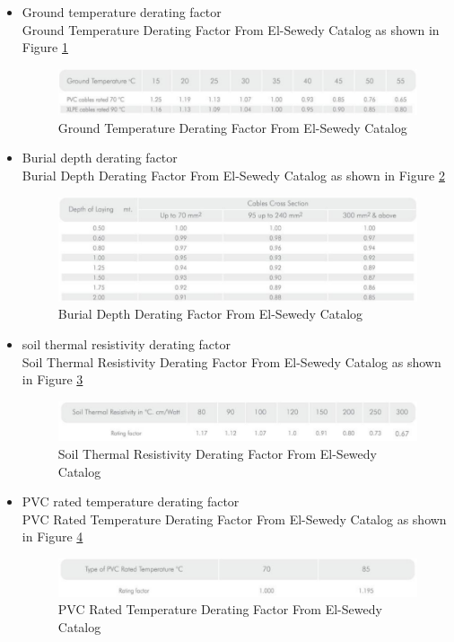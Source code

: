 \documentclass[12pt,fleqn]{book} %
\begin{document}
\begin{itemize}
    \item 		Ground temperature derating factor
    \\ Ground Temperature Derating Factor From El-Sewedy Catalog as shown in Figure \ref{fig:yousef 4}
       \begin{figure}[h!]
    \centering
    \includegraphics[width=0.8\linewidth]{yousef 4.png}
    \caption{ Ground Temperature Derating Factor From El-Sewedy Catalog}
    \label{fig:yousef 4}
\end{figure}
    \item Burial depth derating factor 
    \\ Burial Depth Derating Factor From El-Sewedy Catalog as shown in Figure \ref{fig:yousef 5}
     \begin{figure}[h!]
    \centering
    \includegraphics[width=0.8\linewidth]{yousef 5.png}
    \caption{ Burial Depth Derating Factor From El-Sewedy Catalog}
    \label{fig:yousef 5}
\end{figure}
    \item soil thermal resistivity derating factor
    \\ Soil Thermal Resistivity Derating Factor From El-Sewedy Catalog as shown in Figure \ref{fig:yousef 6}
    \begin{figure}[h!]
    \centering
    \includegraphics[width=0.8\linewidth]{yousef 6.png}
    \caption{ Soil Thermal Resistivity Derating Factor From El-Sewedy Catalog}
    \label{fig:yousef 6}
\end{figure}
     \item PVC rated temperature derating factor
     \\ PVC Rated Temperature Derating Factor From El-Sewedy Catalog as shown in Figure \ref{fig:yousef 7}
     \begin{figure}[h!]
    \centering
    \includegraphics[width=0.8\linewidth]{yousef 7.png}
    \caption{ PVC Rated Temperature Derating Factor From El-Sewedy Catalog}
    \label{fig:yousef 7}
\end{figure}
       \end{itemize}
\end{document}
